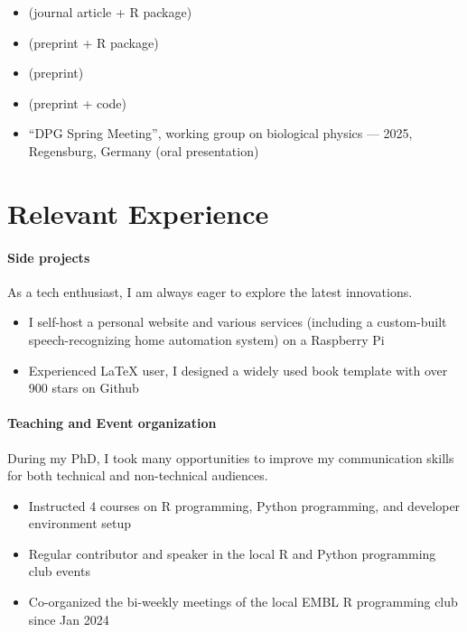 \documentclass[
	DIV=23,
]{scrartcl}
\begin{document}
\begin{itemize}
	\item {} (journal article + R package)
	\item {} (preprint + R package)
	\item {} (preprint)
	\item {} (preprint + code)
	\item \enquote{DPG Spring Meeting}, working group on biological physics --- 2025, Regensburg, Germany (oral presentation)
\end{itemize}

\section*{Relevant Experience}

\paragraph{Side projects}
\noindent As a tech enthusiast, I am always eager to explore the latest innovations.
\begin{itemize}
	\item I self-host a personal website and various services (including a custom-built speech-recognizing home automation system) on a Raspberry Pi
	\item Experienced LaTeX user, I designed a widely used book template with over 900 stars on Github
\end{itemize}

\paragraph{Teaching and Event organization}
\noindent During my PhD, I took many opportunities to improve my communication skills for both technical and non-technical audiences.
\begin{itemize}
	\item Instructed 4 courses on R programming, Python programming, and developer environment setup
	\item Regular contributor and speaker in the local R and Python programming club events
	\item Co-organized the bi-weekly meetings of the local EMBL R programming club since Jan 2024
\end{itemize}
\end{document}
